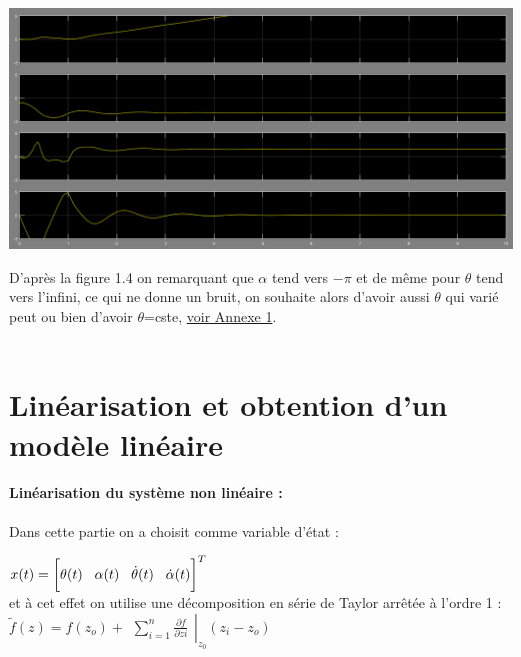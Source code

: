 \documentclass[12pt, a4paper, openany]{report}
\begin{document}
\begin{center}
\includegraphics[scale=0.4]{alpha=-1.PNG}
\label{fig1} 
\end{center}

D’après la figure 1.4 on remarquant que $\alpha$ tend vers $-\pi$ et de même pour $\theta$
tend vers l'infini, ce qui ne donne un bruit, on souhaite alors d'avoir aussi $\theta$ qui varié peut ou bien d'avoir $\theta$=cste, \hyperref[section1.1]{voir Annexe 1}\label{annexe1}.\\\\

\section{Linéarisation et obtention d'un modèle linéaire}
\paragraph{Linéarisation du système non linéaire :\\}
Dans cette partie on a choisit comme variable d'état :

 $x(t)=\bigg[\theta(t)\hspace{3mm}\alpha(t)\hspace{3mm} \dot{\theta}(t)\hspace{3mm} \dot{\alpha}(t)\bigg]^{T}$ \\  
   et à cet effet on utilise une décomposition en série de Taylor arrêtée à l'ordre 1 :\\
   
   $\tilde{f}(z)=f(z_{o})+\left.\begin{matrix}\sum_{i=1}^{n}\frac{\partial f }{\partial zi}\end{matrix}\right|_{z_0} (z_{i}-z_{o})$ \\\\ 
   
\end{document}
